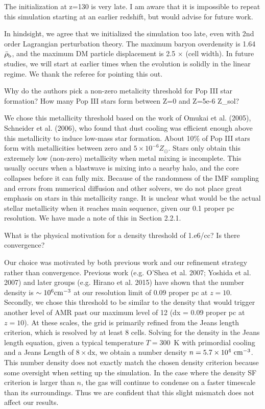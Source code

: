 \documentclass[11pt]{article}
\newenvironment{referee}[1][]{%
    \ignorespaces%
    \begin{mdframed}[style=myquotestyle,#1]%
}{%
    \end{mdframed}%
    \ignorespacesafterend%
}%
\begin{document}
\begin{referee}
The initialization at z=130 is very late. I am aware that it is impossible to repeat this simulation starting at an earlier redshift, but would advise for future work.
\end{referee}
In hindsight, we agree that we initialized the simulation too late, even with 2nd order Lagrangian perturbation theory.  The maximum baryon overdensity is 1.64$\bar{\rho}_{\rm b}$, and the maximum DM particle displacement is 2.5 $\times$ (cell width).  In future studies, we will start at earlier times when the evolution is solidly in the linear regime.  We thank the referee for pointing this out.

\begin{referee}
Why do the authors pick a non-zero metalicity threshold for Pop III star formation? How many Pop III stars form between Z=0 and Z=5e-6 Z\_sol?
\end{referee}
We chose this metallicity threshold based on the work of Omukai et al. (2005), Schneider et al. (2006), who found that dust cooling was efficient enough above this metallicity to induce low-mass star formation. About 10\% of Pop III stars form with metallicities between zero and $5 \times 10^{-6} Z_\odot$.  Stars only obtain this extremely low (non-zero) metallicity when metal mixing is incomplete.  This usually occurs when a blastwave is mixing into a nearby halo, and the core collapses before it can fully mix.  Because of the randomness of the IMF sampling and errors from numerical diffusion and other solvers, we do not place great emphasis on stars in this metallicity range.  It is unclear what would be the actual stellar metallicity when it reaches main sequence, given our 0.1 proper pc resolution.  We have made a note of this in Section 2.2.1.

\begin{referee}
What is the physical motivation for a density threshold of 1.e6/cc? Is there convergence?
\end{referee}
Our choice was motivated by both previous work and our refinement strategy rather than convergence. Previous work (e.g. O'Shea et al. 2007; Yoshida et al. 2007) and later groups (e.g. Hirano et al. 2015) have shown that the number density is $\sim 10^6 \cubecm$ at our resolution limit of $0.09$ proper pc at $z=10$.  Secondly, we chose this threshold to be similar to the density that would trigger another level of AMR past our maximum level of 12 (dx = 0.09 proper pc at $z=10$).  At these scales, the grid is primarily refined from the Jeans length criterion, which is resolved by at least 8 cells.  Solving for the density in the Jeans length equation, given a typical temperature $T=300$~K with primordial cooling and a Jeans Length of $8 \times \textrm{dx}$, we obtain a number density $n = 5.7 \times 10^4~\cubecm$.  This number density does not exactly match the chosen density criterion because some oversight when setting up the simulation.  In the case where the density SF criterion is larger than $n$, the gas will continue to condense on a faster timescale than its surroundings.  Thus we are confident that this slight mismatch does not affect our results.
\end{document}
